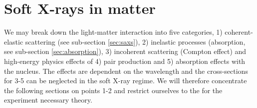 \section{Soft X-rays in matter}\label{sec:light-matter-interaction}
We may break down the light-matter interaction into five categories, 1) coherent-elastic scattering (see sub-section \ref{sec:saxs}), 2) inelastic processes (absorption, see sub-section \ref{sec:absorption}), 3) incoherent scattering (Compton effect) and high-energy physics effects of 4) pair production and 5) absorption effects with the nucleus. The effects are dependent on the wavelength and the cross-sections for 3-5 can be neglected in the soft X-ray regime. We will therefore concentrate the following sections on points 1-2 and restrict ourselves to the for the experiment necessary theory.
%
%
%
